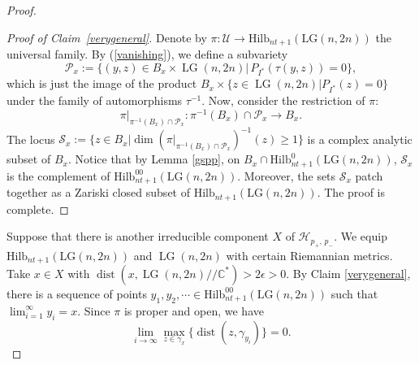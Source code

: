 \documentclass[10pt]{amsart}
\theoremstyle{definition}
\newcommand{\LG}{\operatorname{LG}}
\theoremstyle{plain} %
\begin{document}
\begin{proof}
\begin{proof}[Proof of Claim~\ref{verygeneral}]
Denote by $\pi\colon\mathcal U\rightarrow \mathrm{Hilb}_{nt+1}(\mathrm{LG}(n,2n))$
the universal family. By (\ref{vanishing}), we define a subvariety  
\begin{equation*}
\mathcal P_x:=\{(y,z)\in B_x\times\LG(n,2n)|\,P_{I^*}(\tau(y,z))=0\},    
\end{equation*}
which is just the image of the product $B_x\times\{z\in\LG(n,2n)|P_{I^*}(z)=0\}$ under the family of automorphisms $\tau^{-1}$. Now, consider the restriction of $\pi$:
\begin{equation*}
\pi|_{\pi^{-1}(B_x)\cap\mathcal P_x}\colon\pi^{-1}(B_x)\cap\mathcal P_x\rightarrow B_x.   
\end{equation*}
The locus
$\mathcal S_x:=\{z\in B_x|\dim\left(\pi|_{\pi^{-1}(B_x)\cap\mathcal P_x}\right)^{-1}(z)\geq 1\}$ is a complex analytic subset of $B_x$. Notice that by Lemma \ref{gspp}, on $B_x\cap\mathrm{Hilb}^{0}_{nt+1}(\mathrm{LG}(n,2n))$, $\mathcal S_x$ is the complement of $\mathrm{Hilb}^{00}_{nt+1}(\mathrm{LG}(n,2n))$. Moreover, the sets $\mathcal S_x$ patch together as a Zariski closed subset of $\mathrm{Hilb}_{nt+1}(\mathrm{LG}(n,2n))$. The proof is complete.
\end{proof} 
Suppose that there is another irreducible component $X$ of $\mathcal H_{p_+,\, p_-}$.  We equip $\mathrm{Hilb}_{nt+1}(\mathrm{LG}(n,2n))$ and $\LG(n,2n)$ with certain Riemannian metrics.
Take $x\in X$ with $\operatorname{dist}(x,\LG(n,2n)\! /\!/\mathbb C^*)>2\epsilon>0$. %
By Claim \ref{verygeneral}, there is a sequence of points $y_1,y_2,\cdots\in\mathrm{Hilb}^{00}_{nt+1}(\mathrm{LG}(n,2n))$ such that $\lim_{i=1}^{\infty}y_i=x$. Since $\pi$ is proper and open, we have
$$\lim_{i\rightarrow\infty}\max_{z\in\gamma_{x}}\{\operatorname{dist}(z,\gamma_{y_i})\}=0.$$


\end{proof}
\end{document}
